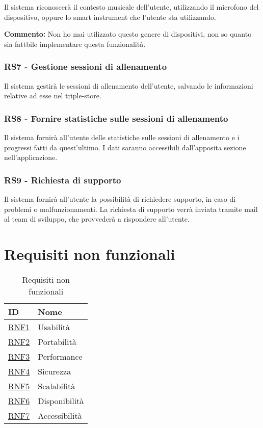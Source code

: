 \documentclass[12pt, a4paper]{article}
\begin{document}
Il sistema riconoscerà il contesto musicale dell'utente, utilizzando il microfono del dispositivo, oppure lo smart instrument che l'utente sta utilizzando.

\textbf{Commento: }Non ho mai utilizzato questo genere di dispositivi, non so quanto sia fattbile implementare questa funzionalità.

\subsubsection*{\hypertarget{RS7}{RS7 - Gestione sessioni di allenamento}}

Il sistema gestirà le sessioni di allenamento dell'utente, salvando le informazioni relative ad esse nel triple-store.

\subsubsection*{\hypertarget{RS8}{RS8 - Fornire statistiche sulle sessioni di allenamento}}

Il sistema fornirà all'utente delle statistiche sulle sessioni di allenamento e i progressi fatti da quest'ultimo. I dati saranno accessibili dall'apposita sezione nell'applicazione.

\subsubsection*{\hypertarget{RS9}{RS9 - Richiesta di supporto}}

Il sistema fornirà all'utente la possibilità di richiedere supporto, in caso di problemi o malfunzionamenti. La richiesta di supporto verrà inviata tramite mail al team di sviluppo, che provvederà a rispondere all'utente.


\section{Requisiti non funzionali}

\begin{table}[h]
    \centering
    \begin{tabular}{|p{}|p{}|}
        \hline
        \textbf{ID}            & \textbf{Nome} \\
        \hline
        \hyperlink{RNF1}{RNF1} & Usabilità     \\
        \hline
        \hyperlink{RNF2}{RNF2} & Portabilità   \\
        \hline
        \hyperlink{RNF3}{RNF3} & Performance   \\
        \hline
        \hyperlink{RNF4}{RNF4} & Sicurezza     \\
        \hline
        \hyperlink{RNF5}{RNF5} & Scalabilità   \\
        \hline
        \hyperlink{RNF6}{RNF6} & Disponibilità \\
        \hline
        \hyperlink{RNF7}{RNF7} & Accessibilità \\
        \hline
    \end{tabular}
    \caption{Requisiti non funzionali}
\end{table}
\end{document}
